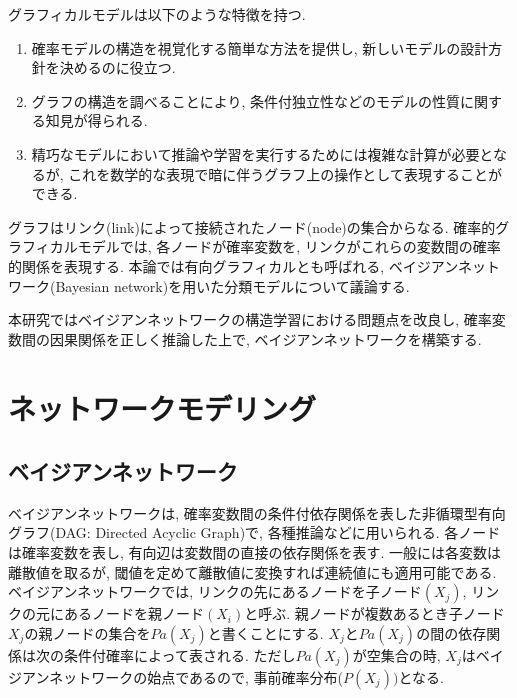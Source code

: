 \documentclass[a4paper]{jarticle}
\begin{document}

グラフィカルモデルは以下のような特徴を持つ.\citep{Bishop2}

\begin{enumerate}

\item 確率モデルの構造を視覚化する簡単な方法を提供し, 新しいモデルの設計方針を決めるのに役立つ.

\item グラフの構造を調べることにより, 条件付独立性などのモデルの性質に関する知見が得られる.

\item 精巧なモデルにおいて推論や学習を実行するためには複雑な計算が必要となるが, これを数学的な表現で暗に伴うグラフ上の操作として表現することができる.

\end{enumerate}

グラフはリンク(link)によって接続されたノード(node)の集合からなる. 確率的グラフィカルモデルでは, 各ノードが確率変数を, リンクがこれらの変数間の確率的関係を表現する. 本論では有向グラフィカルとも呼ばれる, ベイジアンネットワーク(Bayesian network)を用いた分類モデルについて議論する.

本研究ではベイジアンネットワークの構造学習における問題点を改良し, 確率変数間の因果関係を正しく推論した上で, ベイジアンネットワークを構築する.

\section{ネットワークモデリング}

\subsection{ベイジアンネットワーク}

ベイジアンネットワークは, 確率変数間の条件付依存関係を表した非循環型有向グラフ(DAG: Directed Acyclic Graph)で, 各種推論などに用いられる. 各ノードは確率変数を表し, 有向辺は変数間の直接の依存関係を表す. 一般には各変数は離散値を取るが, 閾値を定めて離散値に変換すれば連続値にも適用可能である. ベイジアンネットワークでは, リンクの先にあるノードを子ノード$(X_j)$, リンクの元にあるノードを親ノード$(X_i)$と呼ぶ. 親ノードが複数あるとき子ノード$X_j$の親ノードの集合を$Pa(X_j)$と書くことにする. $X_j$と$Pa(X_j)$の間の依存関係は次の条件付確率によって表される. ただし$Pa(X_j)$が空集合の時, $X_j$はベイジアンネットワークの始点であるので, 事前確率分布($P(X_j))$となる.
\end{document}
